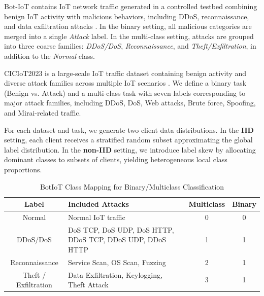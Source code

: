 \documentclass[journal,twoside,web]{ieeecolor}
\begin{document}
Bot-IoT contains IoT network traffic generated in a controlled testbed combining benign IoT activity with malicious behaviors, including DDoS, reconnaissance, and data exfiltration attacks \cite{moustafa2019botiot}. In the binary setting, all malicious categories are merged into a single \emph{Attack} label. In the multi-class setting, attacks are grouped into three coarse families: \emph{DDoS/DoS}, \emph{Reconnaissance}, and \emph{Theft/Exfiltration}, in addition to the \emph{Normal} class.

CICIoT2023 is a large-scale IoT traffic dataset containing benign activity and diverse attack families across multiple IoT scenarios \cite{ciciot2023dataset}. We define a binary task (Benign vs. Attack) and a multi-class task with seven labels corresponding to major attack families, including DDoS, DoS, Web attacks, Brute force, Spoofing, and Mirai-related traffic.

For each dataset and task, we generate two client data distributions. In the \textbf{IID} setting, each client receives a stratified random subset approximating the global label distribution. In the \textbf{non-IID} setting, we introduce label skew by allocating dominant classes to subsets of clients, yielding heterogeneous local class proportions.


\begin{table}[!t]
\caption{BotIoT Class Mapping for Binary/Multiclass Classification }
\label{tab:botiot_class_mappings}
\centering
\footnotesize
\begin{tabularx}{\columnwidth}{|c|X|c|c|}
\hline
\textbf{Label} & \textbf{Included Attacks} & \textbf{Multiclass} & \textbf{Binary} \\ \hline
 Normal & Normal IoT traffic & 0 & 0 \\ \hline
 DDoS/DoS & DoS TCP, DoS UDP, DoS HTTP, DDoS TCP, DDoS UDP, DDoS HTTP & 1 & 1 \\ \hline
 Reconnaissance & Service Scan, OS Scan, Fuzzing & 2 & 1 \\ \hline
 Theft / Exfiltration & Data Exfiltration, Keylogging, Theft Attack &3 & 1 \\ \hline
\end{tabularx}
\end{table}
\end{document}
